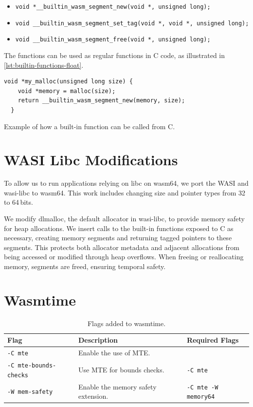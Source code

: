\begin{itemize}
  \item[] \lstinline[style=customc]{void *__builtin_wasm_segment_new(void *, unsigned long);}
  \item[] \lstinline[style=customc]{void __builtin_wasm_segment_set_tag(void *, void *, unsigned long);}
  \item[] \lstinline[style=customc]{void __builtin_wasm_segment_free(void *, unsigned long);}
\end{itemize}

\noindent
The functions can be used as regular functions in C code, as illustrated in \cref{lst:builtin-functions-float}.

\begin{lstfloat}
  \begin{lstlisting}[frame=h,style=customc,
    label={lst:builtin-functions}]
  void *my_malloc(unsigned long size) {
    void *memory = malloc(size);
    return __builtin_wasm_segment_new(memory, size);
  }
  \end{lstlisting}
  \caption{Example of how a built-in function can be called from C.}
  \label{lst:builtin-functions-float}
\end{lstfloat}

\section{WASI Libc Modifications}
\label{sec:wasi-libc}

To allow us to run applications relying on libc on wasm64, we port the \acf{WASI} and wasi-libc to wasm64.
This work includes changing size and pointer types from 32 to 64\,bits.

We modify dlmalloc, the default allocator in wasi-libc, to provide memory safety for heap allocations.
We insert calls to the built-in functions exposed to C as necessary, creating memory segments and returning tagged pointers to these segments.
This protects both allocator metadata and adjacent allocations from being accessed or modified through heap overflows.
When freeing or reallocating memory, segments are freed, ensuring temporal safety.

\section{Wasmtime}
\label{sec:wasm-runtime}

\begin{table}[t]
  \centering
  \caption{Flags added to wasmtime.}
  \label{tab:wasmtime-flags}
  \begin{tabular}{l | l | l}
    \textbf{Flag} & \textbf{Description} & \textbf{Required Flags} \\
    \hline
    \texttt{-C mte}               & Enable the use of \ac{MTE}. & \\
    \texttt{-C mte-bounds-checks} & Use \ac{MTE} for bounds checks. & \texttt{-C mte} \\
    \texttt{-W mem-safety}        & Enable the memory safety extension. & \texttt{-C mte -W memory64} \\
  \end{tabular}
\end{table}

